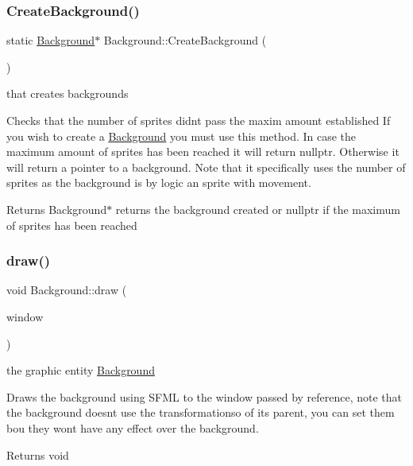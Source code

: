 \subsubsection{\texorpdfstring{Create\+Background()}{CreateBackground()}}
{\footnotesize\ttfamily static \hyperlink{class_background}{Background}$\ast$ Background\+::\+Create\+Background (\begin{DoxyParamCaption}{ }\end{DoxyParamCaption})\hspace{0.3cm}{\ttfamily [static]}}

that creates backgrounds

Checks that the number of sprites didn\textquotesingle{}t pass the maxim amount established If you wish to create a \hyperlink{class_background}{Background} you must use this method. In case the maximum amount of sprites has been reached it will return nullptr. Otherwise it will return a pointer to a background. Note that it specifically uses the number of sprites as the background is by logic an sprite with movement.

\begin{DoxyReturn}{Returns}
Background$\ast$ returns the background created or nullptr if the maximum of sprites has been reached 
\end{DoxyReturn}
\mbox{\label{class_background_ae3d10fe0882df48b0e1e861a7e69f37f}} 
\subsubsection{\texorpdfstring{draw()}{draw()}}
{\footnotesize\ttfamily void Background\+::draw (\begin{DoxyParamCaption}\item[{sf\+::\+Render\+Window \&}]{window }\end{DoxyParamCaption})}

the graphic entity \hyperlink{class_background}{Background}

Draws the background using S\+F\+ML to the window passed by reference, note that the background doesn\textquotesingle{}t use the transformationso of it\textquotesingle{}s parent, you can set them bou they won\textquotesingle{}t have any effect over the background.

\begin{DoxyReturn}{Returns}
void 
\end{DoxyReturn}

